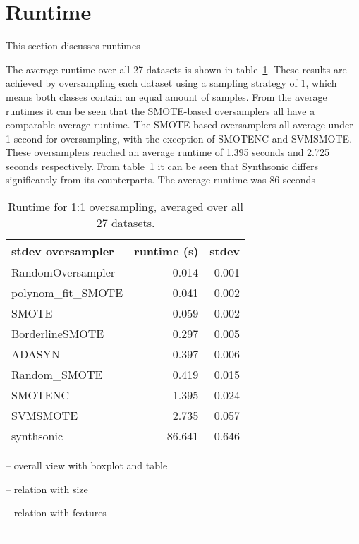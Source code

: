 \section{Runtime}
This section discusses runtimes

The average runtime over all 27 datasets is shown in table~\ref{tab:runtimes}. These results are achieved by oversampling each dataset using a sampling strategy of 1, which means both classes contain an equal amount of samples. From the average runtimes it can be seen that the SMOTE-based oversamplers all have a comparable average runtime. The SMOTE-based oversamplers all average under 1 second for oversampling, with the exception of SMOTENC and SVMSMOTE. These oversamplers reached an average runtime of 1.395 seconds and 2.725 seconds respectively. From table~\ref{tab:runtimes} it can be seen that Synthsonic differs significantly from its counterparts. The average runtime was 86 seconds

\begin{table}[]
    \centering
    \begin{tabular}{lrr}
    \toprule
    stdev oversampler & runtime (s) &  stdev \\
    \midrule
    RandomOversampler &    0.014 &        0.001 \\
    polynom\_fit\_SMOTE &    0.041 &        0.002 \\
    SMOTE             &    0.059 &        0.002 \\
    BorderlineSMOTE   &    0.297 &        0.005 \\
    ADASYN            &    0.397 &        0.006 \\
    Random\_SMOTE      &    0.419 &        0.015 \\
    SMOTENC           &    1.395 &        0.024 \\
    SVMSMOTE          &    2.735 &        0.057 \\
    synthsonic        &   86.641 &        0.646 \\
    \bottomrule
    \end{tabular}
    \caption{Runtime for 1:1 oversampling, averaged over all 27 datasets.}
    \label{tab:runtimes}
\end{table}



-- overall view with boxplot and table


-- relation with size 

-- relation with features

-- 

